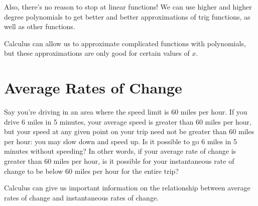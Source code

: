 \documentclass{ximera}
\begin{document}
Also, there's no reason to stop at linear functions! We can use higher and higher degree polynomials to get better and better approximations of trig functions, as well as other functions. 

Calculus can allow us to approximate complicated functions with polynomials, but these approximations are only good for certain values of $x$. 

\section{Average Rates of Change}
Say you're driving in an area where the speed limit is 60 miles per hour. If you drive 6 miles in 5 minutes, your average speed is greater than 60 miles per hour, but your speed at any given point on your trip need not be greater than 60 miles per hour: you may slow down and speed up. Is it possible to go 6 miles in 5 minutes without speeding? In other words, if your average rate of change is greater than 60 miles per hour, is it possible for your instantaneous rate of change to be below 60 miles per hour for the entire trip?

Calculus can give us important information on the relationship between average rates of change and instantaneous rates of change. 
\end{document}
